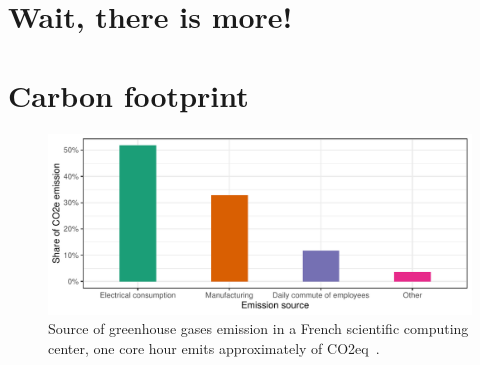 \chapter{Wait, there is more!}
\label{chapter:blabla}

\lipsum[1-5]

\lipsum[11-12]
\chapter{Carbon footprint}
\label{chapter:blabla}

\lipsum[11-12]

\begin{figure}[tpb]
    \centering
    \includegraphics[width=\linewidth]{img/co2_per_hour.pdf}
    \caption{Source of greenhouse gases emission in a French scientific computing center, one core hour emits
    approximately  of CO2eq~\cite{corehour_co2}.}%
    \label{fig:appendix:co2_per_hour}
\end{figure}
